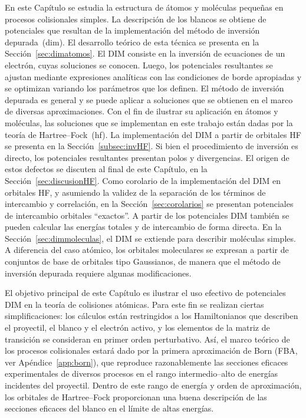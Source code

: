 En este Capítulo se estudia la estructura de átomos y moléculas pequeñas
en procesos colisionales simples. La descripción de los blancos se 
obtiene de potenciales que resultan de la implementación del método de 
inversión depurada~(\acs{dim}). El desarrollo teórico de esta técnica se 
presenta en la Sección~\ref{sec:dimatomos}. El DIM consiste en la 
inversión de ecuaciones de un electrón, cuyas soluciones se conocen. 
Luego, los potenciales resultantes se ajustan mediante expresiones 
analíticas con las condiciones de borde apropiadas y se optimizan 
variando los parámetros que los definen. El método de inversión depurada 
es general y se puede aplicar a soluciones que se obtienen en el marco 
de diversas aproximaciones. Con el fin de ilustrar su aplicación en 
átomos y moléculas, las soluciones que se implementan en este trabajo 
están dadas por la teoría de Hartree--Fock~(\acs{hf}). La implementación 
del DIM a partir de orbitales HF se presenta en la 
Sección~\ref{subsec:invHF}. Si bien el procedimiento de inversión es 
directo, los potenciales resultantes presentan polos y divergencias. 
El origen de estos defectos se discuten al final de este Capítulo, en la 
Sección~\ref{sec:discusionHF}. Como corolario de la implementación del 
DIM en orbitales HF, y asumiendo la validez de la separación de los 
términos de intercambio y correlación, en la 
Sección~\ref{sec:corolarios} se presentan potenciales de intercambio 
orbitales ``exactos''. A partir de los potenciales DIM también se pueden 
calcular las energías totales y de intercambio de forma directa. En la 
Sección~\ref{sec:dimmoleculas}, el DIM se extiende para describir 
moléculas simples. A diferencia del caso atómico, los orbitales 
moleculares se expresan a partir de conjuntos de base de orbitales tipo 
Gaussianos, de manera que el método de inversión depurada requiere 
algunas modificaciones.

El objetivo principal de este Capítulo es ilustrar el uso efectivo de 
potenciales DIM en la teoría de colisiones atómicas. Para este fin 
se realizan ciertas simplificaciones: los cálculos están restringidos a 
los Hamiltonianos que describen el proyectil, el blanco y el electrón 
activo, y los elementos de la matriz de transición se consideran en 
primer orden perturbativo. %
Así, el marco teórico de los procesos colisionales estará dado por la 
primera aproximación de Born (FBA, ver Apéndice~\ref{app:born}), que 
reproduce razonablemente las secciones eficaces experimentales de 
diversos procesos en el rango intermedio--alto de energías incidentes 
del proyectil. Dentro de este rango de energía y orden de aproximación, 
los orbitales de Hartree--Fock proporcionan una buena descripción de las 
secciones eficaces del blanco en el límite de altas energías.

